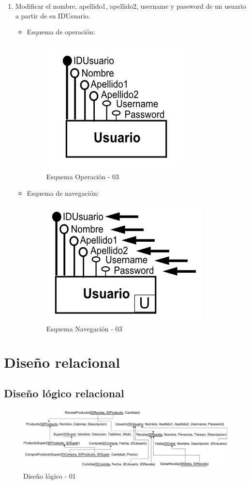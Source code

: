 \documentclass[a4paper,12pt]{report}
\begin{document}
\begin{enumerate}
\item Modificar el nombre, apellido1, apellido2, username y password
de un usuario a partir de su IDUsuario.
\begin{itemize}
\item Esquema de operación:
\begin{figure}[!htp]
\centering
\includegraphics[width=0.4\linewidth]{./operaciones/img/Usuarios/03_ope.png}
\caption{Esquema Operación - 03}
\label{fig:ope03}
\medskip
\footnotesize
{}
\end{figure}
\item Esquema de navegación:
\begin{figure}[!htp]
\centering
\includegraphics[width=0.4\linewidth]{./operaciones/img/Usuarios/03_nav.png}
\caption{Esquema Navegación - 03}
\label{fig:nave03}
\medskip
\footnotesize
{}
\end{figure}
\end{itemize}
\end{enumerate}
\chapter{Diseño relacional}
\label{sec-8}
\section{Diseño lógico relacional}
\label{sec-8-1}
\begin{figure}[!htp]
\centering
\includegraphics[width=0.9\linewidth]{./refinamientos/logico.png}
\caption{Diseño lógico - 01}
\label{fig:DLR}
\medskip
\footnotesize
{}
\end{figure}
\end{document}
